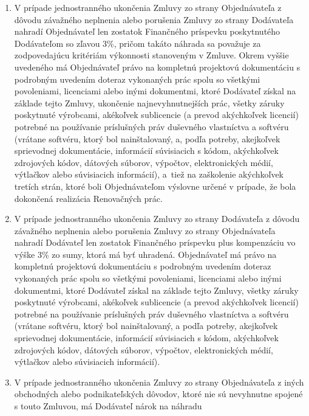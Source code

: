 \begin{multicols}{2}
\begin{enumerate}
  \begin{enumerate}
  \def\labelenumii{\arabic{enumii}.}
  \item
    V prípade jednostranného ukončenia Zmluvy zo strany Objednávateľa z
    dôvodu závažného neplnenia alebo porušenia Zmluvy zo strany
    Dodávateľa nahradí Objednávateľ len zostatok Finančného príspevku
    poskytnutého Dodávateľom so zľavou 3\%, pričom takáto náhrada sa
    považuje za zodpovedajúcu kritériám výkonnosti stanoveným v Zmluve.
    Okrem vyššie uvedeného má Objednávateľ právo na kompletnú projektovú
    dokumentáciu s podrobným uvedením doteraz vykonaných prác spolu so
    všetkými povoleniami, licenciami alebo inými dokumentmi, ktoré
    Dodávateľ získal na základe tejto Zmluvy, ukončenie
    najnevyhnutnejších prác, všetky záruky poskytnuté výrobcami,
    akékoľvek sublicencie (a prevod akýchkoľvek licencií) potrebné na
    používanie príslušných práv duševného vlastníctva a softvéru
    (vrátane softvéru, ktorý bol nainštalovaný, a, podľa potreby,
    akejkoľvek sprievodnej dokumentácie, informácií súvisiacich s kódom,
    akýchkoľvek zdrojových kódov, dátových súborov, výpočtov,
    elektronických médií, výtlačkov alebo súvisiacich informácií),
    a~tiež na zaškolenie akýchkoľvek tretích strán, ktoré boli
    Objednávateľom výslovne určené v prípade, že bola dokončená
    realizácia Renovačných prác.
  \item
    V prípade jednostranného ukončenia Zmluvy zo strany Dodávateľa z
    dôvodu závažného neplnenia alebo porušenia Zmluvy zo strany
    Objednávateľa nahradí Dodávateľ len zostatok Finančného príspevku
    plus kompenzáciu vo výške 3\% zo sumy, ktorá má byť uhradená.
    Objednávateľ má právo na kompletnú projektovú dokumentáciu s
    podrobným uvedením doteraz vykonaných prác spolu so všetkými
    povoleniami, licenciami alebo inými dokumentmi, ktoré Dodávateľ
    získal na základe tejto Zmluvy, všetky záruky poskytnuté výrobcami,
    akékoľvek sublicencie (a prevod akýchkoľvek licencií) potrebné na
    používanie príslušných práv duševného vlastníctva a softvéru
    (vrátane softvéru, ktorý bol nainštalovaný, a podľa potreby,
    akejkoľvek sprievodnej dokumentácie, informácií súvisiacich s kódom,
    akýchkoľvek zdrojových kódov, dátových súborov, výpočtov,
    elektronických médií, výtlačkov alebo súvisiacich informácií).
  \item
    V prípade jednostranného ukončenia Zmluvy zo strany Objednávateľa z
    iných obchodných alebo podnikateľských dôvodov, ktoré nie sú
    nevyhnutne spojené s touto Zmluvou, má Dodávateľ nárok na náhradu

\end{enumerate}
\end{enumerate}
\end{multicols}
